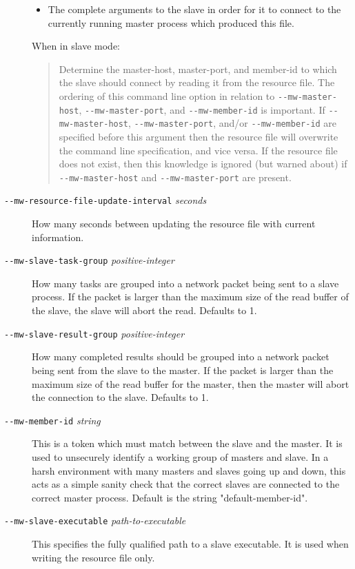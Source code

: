 \documentclass[titlepage,12pt]{book}
\newcommand{\dash}{\texttt{-}}
\newcommand{\Option}[1]{\dash\dash\texttt{#1}}
\newcommand{\OptionV}[2]{\dash\dash\texttt{#1} \textit{#2}}
\begin{document}
\begin{description}
\begin{itemize}
		\item The complete arguments to the slave in order for it to
			connect to the currently running master process which 
			produced this file.
    \end{itemize}
    When in slave mode:
	\begin{quotation}
      Determine the master-host, master-port, and member-id to which
      the slave should connect by reading it from the resource file.
      The ordering of this command line option in relation to
      \Option{mw-master-host}, \Option{mw-master-port}, and 
	  \Option{mw-member-id} is
      important. If \Option{mw-master-host}, \Option{mw-master-port}, and/or
      \Option{mw-member-id} are specified before this argument then the
      resource file will overwrite the command line specification,
      and vice versa. If the resource file does not exist, then this
      knowledge is ignored (but warned about) if \Option{mw-master-host}
      and \Option{mw-master-port} are present.
	\end{quotation}
\item[\OptionV{mw-resource-file-update-interval}{seconds}]
    How many seconds between updating the resource file with current
    information.
\item[\OptionV{mw-slave-task-group}{positive-integer}]
    How many tasks are grouped into a network packet being sent
    to a slave process. If the packet is larger than the maximum
    size of the read buffer of the slave, the slave will abort the
    read. Defaults to 1.
\item[\OptionV{mw-slave-result-group}{positive-integer}]
    How many completed results should be grouped into a network packet
    being sent from the slave to the master. If the packet is larger than the
    maximum size of the read buffer for the master, then the master will
    abort the connection to the slave. Defaults to 1.
\item[\OptionV{mw-member-id}{string}]
    This is a token which must match between the slave and the master. It is
    used to unsecurely identify a working group of masters and slave. In a
    harsh environment with many masters and slaves going up and down, this
    acts as a simple sanity check that the correct slaves are connected to the
    correct master process. Default is the string "default-member-id".
\item[\OptionV{mw-slave-executable}{path-to-executable}]
    This specifies the fully qualified path to a slave executable. It is used
    when writing the resource file only.
\end{description}
\end{document}
